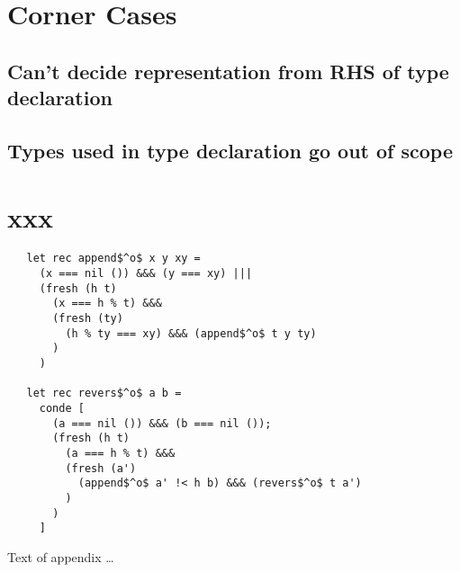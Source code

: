 \documentclass[acmsmall,review,anonymous]{acmart}\settopmatter{printfolios=true,printccs=false,printacmref=false}
\begin{document}
\section{Corner Cases}
\label{chap:pitfalls}

\subsection{Can't decide representation from RHS of type declaration}

\subsection{Types used in type declaration go out of scope}

\section{xxx}
\begin{lstlisting}
   let rec append$^o$ x y xy =
     (x === nil ()) &&& (y === xy) |||
     (fresh (h t)
       (x === h % t) &&&
       (fresh (ty)
         (h % ty === xy) &&& (append$^o$ t y ty)
       )
     )

   let rec revers$^o$ a b =
     conde [
       (a === nil ()) &&& (b === nil ());
       (fresh (h t)
         (a === h % t) &&&
         (fresh (a')
           (append$^o$ a' !< h b) &&& (revers$^o$ t a')
         )
       )
     ]
\end{lstlisting}

%


Text of appendix \ldots
\end{document}
